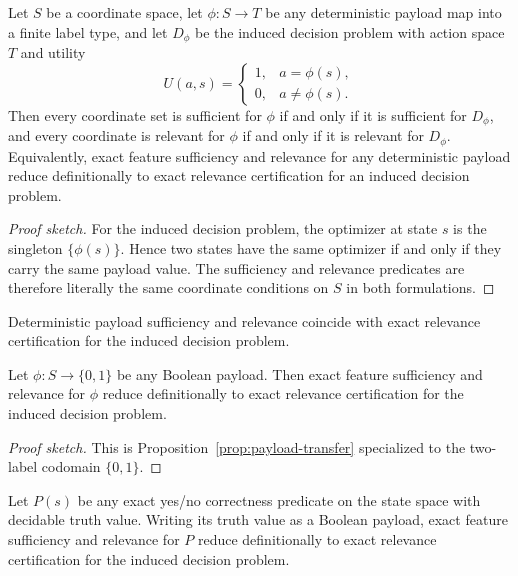 \begin{proposition}\label{prop:payload-transfer}
Let $S$ be a coordinate space, let $\phi : S \to T$ be any deterministic payload map into a finite label type, and let $D_{\phi}$ be the induced decision problem with action space $T$ and utility
\[
U(a,s)=\begin{cases}
1,& a=\phi(s),\\
0,& a\neq \phi(s).
\end{cases}
\]
Then every coordinate set is sufficient for $\phi$ if and only if it is sufficient for $D_{\phi}$, and every coordinate is relevant for $\phi$ if and only if it is relevant for $D_{\phi}$. Equivalently, exact feature sufficiency and relevance for any deterministic payload reduce definitionally to exact relevance certification for an induced decision problem.
\end{proposition}

\begin{proof}[Proof sketch]
For the induced decision problem, the optimizer at state $s$ is the singleton $\{\phi(s)\}$. Hence two states have the same optimizer if and only if they carry the same payload value. The sufficiency and relevance predicates are therefore literally the same coordinate conditions on $S$ in both formulations.
\end{proof}

Deterministic payload sufficiency and relevance coincide with exact relevance certification for the induced decision problem.

\begin{corollary}\label{cor:boolean-payload-transfer}
Let $\phi : S \to \{0,1\}$ be any Boolean payload. Then exact feature sufficiency and relevance for $\phi$ reduce definitionally to exact relevance certification for the induced decision problem.
\end{corollary}

\begin{proof}[Proof sketch]
This is Proposition~\ref{prop:payload-transfer} specialized to the two-label codomain $\{0,1\}$.
\end{proof}

\begin{corollary}\label{cor:predicate-transfer}
Let $P(s)$ be any exact yes/no correctness predicate on the state space with decidable truth value. Writing its truth value as a Boolean payload, exact feature sufficiency and relevance for $P$ reduce definitionally to exact relevance certification for the induced decision problem.
\end{corollary}


